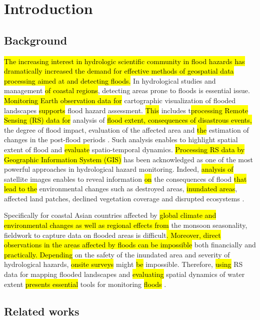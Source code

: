 \documentclass[water,article,submit,pdftex,moreauthors]{Definitions/mdpi}
\begin{document}
\section{Introduction}

\subsection{Background}
\hl{The increasing interest in hydrologic scientific community in flood hazards has dramatically increased the demand for effective methods of geospatial data processing aimed at and detecting floods. }In hydrological studies and\hl{ }management \hl{of coastal regions}, detecting areas prone to floods is essential issue. \hl{Monitoring Earth observation data for }cartographic visualization of flooded landscapes\hl{ supports} flood hazard assessment. \hl{This} includes t\hl{processing Remote Sensing (RS) data for} analysis of \hl{flood extent, consequences of disastrous events, }the degree of flood impact, evaluation of the affected area and \hl{the }estimation of changes in the post-flood periods \cite{su142114145,w15152802,su142316270}. Such analysis enables to highlight\hl{ }spatial extent of\hl{ }flood and \hl{evaluate }spatio-temporal dynamics. \hl{Processing RS data by Geographic Information System (GIS)} has been acknowledged as one of the most powerful approaches in hydrological hazard monitoring. Indeed, \hl{analysis of }satellite images\hl{ }enables to reveal information \hl{on} the consequences of flood \hl{that lead to the } environmental changes such as\hl{ }destroyed areas, \hl{inundated areas}, affected land patches, declined vegetation coverage and disrupted ecosystems \cite{ijgi12110465,rs15102561}. 

Specifically for coastal Asian countries affected by \hl{global climate and environmental changes as well as regional effects from }the monsoon seasonality, fieldwork to capture data on flooded areas is difficult\hl{. Moreover, direct observations in the areas affected by floods can be impossible }both financially and  \hl{practically. Depending} on the safety of the inundated area and severity of hydrological hazards, \hl{onsite surveys }might \hl{be} impossible. Therefore, \hl{using }RS data\hl{ }for mapping flooded landscapes and \hl{evaluating }spatial dynamics of water extent \hl{presents essential }tools for monitoring \hl{floods} \cite{YASEEN2024101665,GHALEHTEIMOURI2023}. 

\subsection{Related works}
\end{document}
